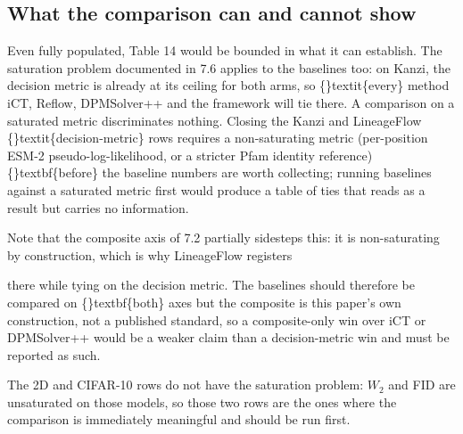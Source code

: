 \documentclass{article}
\begin{document}
\subsection{What the comparison can and cannot show}
Even fully populated, Table 14 would be bounded in what it can establish. The saturation problem documented in 7.6 applies to the baselines too: on Kanzi, the decision metric is already at its ceiling for both arms, so \{\}textit\{every\} method  iCT, Reflow, DPMSolver++ and the framework  will tie there. A comparison on a saturated metric discriminates nothing. Closing the Kanzi and LineageFlow \{\}textit\{decision-metric\} rows requires a non-saturating metric (per-position ESM-2 pseudo-log-likelihood, or a stricter Pfam identity reference) \{\}textbf\{before\} the baseline numbers are worth collecting; running baselines against a saturated metric first would produce a table of ties that reads as a result but carries no information.

Note that the composite axis of 7.2 partially sidesteps this: it is non-saturating by construction, which is why LineageFlow registers

 there while tying on the decision metric. The baselines should therefore be compared on \{\}textbf\{both\} axes  but the composite is this paper's own construction, not a published standard, so a composite-only win over iCT or DPMSolver++ would be a weaker claim than a decision-metric win and must be reported as such.

The 2D and CIFAR-10 rows do not have the saturation problem: $W_2$ and FID are unsaturated on those models, so those two rows are the ones where the comparison is immediately meaningful and should be run first.
\end{document}
